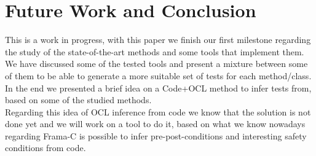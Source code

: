 \documentclass[10pt, conference, compsocconf]{IEEEtran}
\begin{document}
\section{Future Work and Conclusion}
This is a work in progress, with this paper we finish our first milestone regarding the study of the state-of-the-art methods and some tools that
implement them. We have discussed some of the tested tools and present a mixture between some of them to be able to generate a more suitable
set of tests for each method/class. In the end we presented a brief idea on a Code+OCL method to infer tests from, based on some of the studied methods.\\
Regarding this idea of OCL inference from code we know that the solution is not done yet and we will work on a tool to do it, based on what we know nowadays
regarding Frama-C is possible to infer pre-post-conditions\cite{moy} and interesting safety conditions from code.\\




\end{document}
